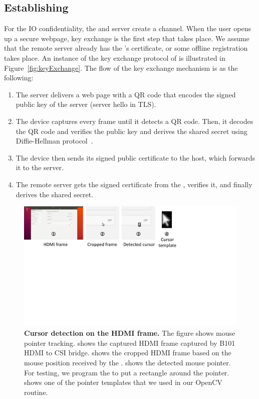 \subsection{Establishing \tls}
\label{sec:prototype:impl:tls}
%
For the IO confidentiality, the \device and server create a \tls channel. When the user opens up a secure webpage, key exchange is the first step that takes place. We assume that the remote server already has the \device's certificate, or some offline registration takes place. An instance of the key exchange protocol of \name is illustrated in Figure~\ref{fig:keyExchange}. The flow of the key exchange mechanism is as the following:
\begin{enumerate}
  \item[\one] The server delivers a web page with a QR code that encodes the signed public key of the server (server hello in TLS). 
  \item[\two] The device captures every frame until it detects a QR code. Then, it decodes the QR code and verifies the public key and derives the shared secret using Diffie-Hellman protocol~\cite{blake1998authenticated}. 
  \item[\three] The device then sends its signed public certificate to the host, which forwards it to the server.
  \item[\four] The remote server gets the signed certificate from the \device, verifies it, and finally derives the shared secret.
\end{enumerate}

\begin{figure}[t]
\centering
\includegraphics[trim={0 12cm 10cm 0}, clip, width=\linewidth]{chapters/ProtectIOn/images/cursorDetect.pdf}
\caption[Cursor detection on the HDMI frame]{\textbf{Cursor detection on the HDMI frame.} The figure shows \name mouse pointer tracking. \one shows the captured HDMI frame captured by B101 HDMI to CSI bridge. \two shows the cropped HDMI frame based on the mouse position received by the \device. \three shows the detected mouse pointer. For testing, we program the \device to put a rectangle around the pointer. \four shows one of the pointer templates that we used in our OpenCV routine.}
\label{fig:cursorDetect}
\centering
\end{figure} 


